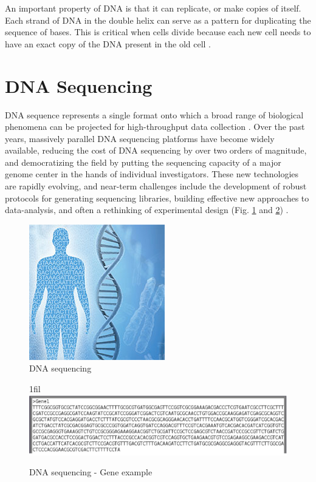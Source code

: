 \documentclass[12pt,openany]{llncs}
\makeatletter
\newcommand*{\centerfloat}{%
  \parindent \z@
  \leftskip \z@ \@plus 1fil \@minus \textwidth
  \rightskip\leftskip
  \parfillskip \z@skip}
\makeatother
\begin{document}
An important property of DNA is that it can replicate, or make copies of itself. Each strand of DNA in the double helix can serve as a pattern for duplicating the sequence of bases. This is critical when cells divide because each new cell needs to have an exact copy of the DNA present in the old cell \cite{DNA3}.

\section{DNA Sequencing}
DNA sequence represents a single format onto which a broad range of biological phenomena can be projected for high-throughput data collection \cite{seq1}. 
Over the past years, massively parallel DNA sequencing platforms have become widely available, reducing the cost of DNA sequencing by over two orders of magnitude, and democratizing the field by putting the sequencing capacity of a major genome center in the hands of individual investigators. These new technologies are rapidly evolving, and near-term challenges include the development of robust protocols for generating sequencing libraries, building effective new approaches to data-analysis, and often a rethinking of experimental design (Fig. \ref{fig:fig-NGS-1} and \ref{fig:fig-NGS-2}) \cite{seq2,seq3}.
\begin{figure}
	\centering
	\includegraphics{./figs/NGS-1}
	\caption{\label{fig:fig-NGS-1}DNA sequencing}
\end{figure}

\begin{figure}
	\centerfloat
	\includegraphics[width=1\linewidth]{./figs/NGS-2}
	\caption{\label{fig:fig-NGS-2}DNA sequencing - Gene example}
\end{figure}
\end{document}
